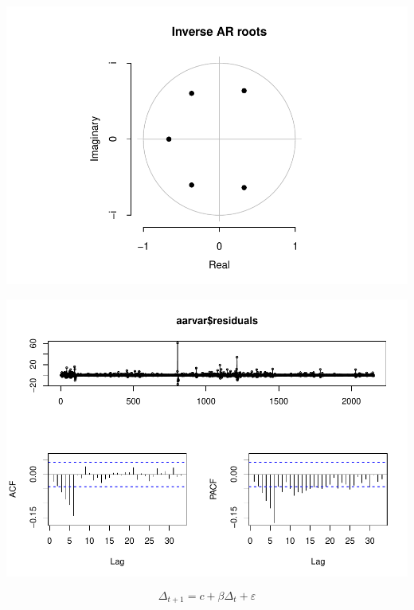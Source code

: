 \documentclass[11pt, a4paper]{report}
\newenvironment{Shaded}{\begin{snugshade}}{\end{snugshade}}
\newcommand{\DataTypeTok}[1]{\textcolor[rgb]{0.13,0.29,0.53}{#1}}
\newcommand{\DecValTok}[1]{\textcolor[rgb]{0.00,0.00,0.81}{#1}}
\newcommand{\KeywordTok}[1]{\textcolor[rgb]{0.13,0.29,0.53}{\textbf{#1}}}
\newcommand{\NormalTok}[1]{#1}
\newcommand{\OperatorTok}[1]{\textcolor[rgb]{0.81,0.36,0.00}{\textbf{#1}}}
\newcommand{\StringTok}[1]{\textcolor[rgb]{0.31,0.60,0.02}{#1}}
\theoremstyle{plain}
\theoremstyle{plain}
\theoremstyle{remark}
\begin{document}
\begin{center}\includegraphics{Econo2_P1_files/figure-latex/auto arima-11} \end{center}

\begin{Shaded}
\end{Shaded}

\begin{center}\includegraphics{Econo2_P1_files/figure-latex/auto arima-12} \end{center}

\[ \Delta_{t+1} = c + \beta \Delta_t + \varepsilon\]

\begin{Shaded}
\end{Shaded}
\end{document}
